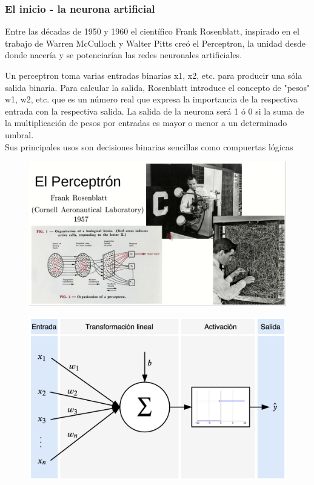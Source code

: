 \documentclass[
	11pt, %
]{beamer}
\begin{document}
\begin{frame}
  \frametitle{El inicio - la neurona artificial}

  Entre las décadas de 1950 y 1960 el científico Frank Rosenblatt, inspirado en el trabajo de Warren McCulloch y Walter Pitts creó el \alert{Perceptron}, la unidad desde donde nacería y se potenciarían las redes neuronales artificiales.

  \bigskip %

  Un perceptron toma varias entradas binarias x1, x2, etc. para producir una sóla salida binaria. Para calcular la salida, Rosenblatt introduce el concepto de "pesos" w1, w2, etc. que es un número real que expresa la importancia de la respectiva entrada con la respectiva salida. La salida de la neurona será 1 ó 0 si la suma de la multiplicación de pesos por entradas es mayor o menor a un determinado umbral.\\
  \bigskip %
  Sus principales usos son decisiones binarias sencillas como compuertas lógicas
\end{frame}

\begin{frame}
  
  \begin{figure}
    \includegraphics[width=0.8\linewidth]{percep.jpg}
  \end{figure}
\end{frame}

\begin{frame}
  
  \begin{figure}
    \includegraphics[width=0.8\linewidth]{perceptron.png}
  \end{figure}
\end{frame}
\end{document}
